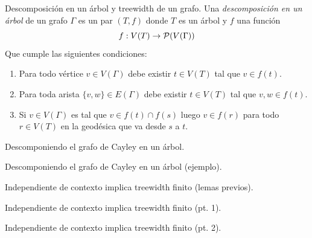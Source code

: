 \documentclass[aspectratio=169, 11pt]{beamer}
\begin{document}
	\begin{frame}{Descomposición en un árbol y treewidth de un grafo.}
	Una \emph{descomposición en un árbol} de un grafo $\Gamma$ es un par $(T,f)$ donde
	$T$ es un árbol y $f$ una función 
	\[
	f: V(T) \to {\cal{P}}(V(\Gamma))
	\]
	Que cumple las siguientes condiciones:
	\begin{enumerate}
		\item Para todo vértice $v \in V(\Gamma)$ debe existir $t \in V(T)$ tal que $v \in f(t)$. 
		\item Para toda arista $\{v,w\} \in E(\Gamma)$ 
		debe existir $t \in V(T)$ tal que $v,w \in f(t)$.
		\item Si $v \in V(\Gamma)$ es tal que $v \in f(t) \cap f(s)$ luego $v \in f(r)$ para todo $r \in V(T)$ en la geodésica que va desde $s$ a $t$.  
	\end{enumerate}
	\end{frame}
	
	\begin{frame}[fragile]{Descomponiendo el grafo de Cayley en un árbol.}
		\TODO{}
	\end{frame}

	\begin{frame}{Descomponiendo el grafo de Cayley en un árbol (ejemplo).}
	\end{frame}	
	
	\begin{frame}[fragile]{Independiente de contexto implica treewidth finito (lemas previos).}
		\TODO{}
	\end{frame}

	\begin{frame}[fragile]{Independiente de contexto implica treewidth finito (pt. 1).}
		\TODO{}
	\end{frame}

	\begin{frame}[fragile]{Independiente de contexto implica treewidth finito (pt. 2).}
		\TODO{}
	\end{frame}
\end{document}
